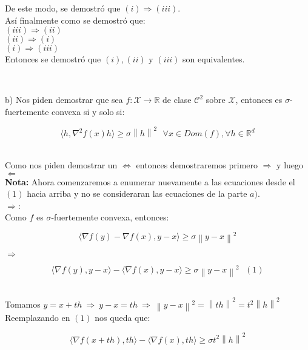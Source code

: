 \documentclass[11pt]{article}
\begin{document}
De este modo, se demostró que $ \boxed{(i)  \Rightarrow  (iii)} $. \\

Así finalmente como se demostró que: \\

$ (iii)  \Rightarrow  (ii) $ \\
$ (ii)  \Rightarrow  (i) $ \\
$ (i)  \Rightarrow  (iii) $ \\

Entonces se demostró que $(i),(ii)$ y $(iii)$ son equivalentes. \\
 
\hrulefill

$ \ $ \

b) Nos piden demostrar que sea $ f: \mathcal{X} \rightarrow \mathbb{R} $ de clase $ \mathcal{C}^{2} $ sobre $ \mathcal{X}$, entonces es $ \sigma$-fuertemente convexa si y solo si: 

\[ \langle h, \nabla^2 f(x) h \rangle \geq \sigma \left\| h \right\|^{2} \ \ \ \forall x \in Dom(f), \forall h \in \mathbb{R}^d \] \

Como nos piden demostrar un $ \Leftrightarrow $ entonces demostraremos primero $ \Rightarrow $ y luego $ \Leftarrow $ \\

\textbf{Nota:} Ahora comenzaremos a enumerar nuevamente a las ecuaciones desde el $(1)$ hacia arriba y no se consideraran las ecuaciones de la parte $a)$. \\

\underline{$ \Rightarrow $}: \\

Como $f$ es $\sigma$-fuertemente convexa, entonces:

\[ \langle \nabla f(y) - \nabla f(x),y-x \rangle \geq \sigma \left\| y-x \right\|^{2}  \]

$ \Rightarrow $ 

\[ \langle \nabla f(y) ,y-x \rangle - \langle \nabla f(x) ,y-x \rangle  \geq \sigma \left\| y-x \right\|^{2} \ \ \ (1) \] \

Tomamos $ y = x + th \ \Rightarrow \ y - x = th \ \Rightarrow \ \left\| y-x \right\|^{2} = \left\| th \right\|^{2} = t^2 \left\| h \right\|^{2} $ \\

Reemplazando en $(1)$ nos queda que: \

\[ \langle \nabla f(x+th) ,th \rangle - \langle \nabla f(x) ,th \rangle  \geq \sigma t^2\left\| h \right\|^{2} \]
\end{document}
